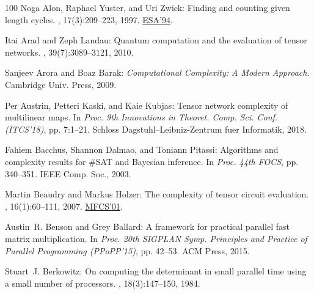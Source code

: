 \begin{thebibliography}{100}
{\sc Noga Alon, Raphael Yuster, and Uri Zwick}: Finding and counting given
  length cycles.
, 17(3):209--223, 1997.
\newblock \prelim \href{https://doi.org/10.1007/BFb0049422}{ESA'94}.
\newblock [\epfmtdoi{10.1007/BF02523189}]

{\sc Itai Arad and Zeph Landau}: Quantum computation and the evaluation of
  tensor networks.
, 39(7):3089--3121, 2010.
\newblock [\epfmtdoi{10.1137/080739379}]

{\sc Sanjeev Arora and Boaz Barak}: {\em Computational Complexity: A Modern
  Approach}.
\newblock Cambridge Univ. Press, 2009.

{\sc Per Austrin, Petteri Kaski, and Kaie Kubjas}: Tensor network complexity of
  multilinear maps.
\newblock In {\em Proc. 9th Innovations in Theoret. Comp. Sci. Conf.
  (ITCS'18)}, pp. 7:1--21. Schloss Dagstuhl--Leibniz-Zentrum fuer Informatik,
  2018.

{\sc Fahiem Bacchus, Shannon Dalmao, and Toniann Pitassi}: Algorithms and
  complexity results for {\#}{SAT} and {B}ayesian inference.
\newblock In {\em Proc. 44th FOCS}, pp. 340--351. IEEE Comp. Soc., 2003.

{\sc Martin Beaudry and Markus Holzer}: The complexity of tensor circuit
  evaluation.
, 16(1):60--111, 2007.
\newblock \prelim \href{https://doi.org/10.1007/3-540-44683-4\_16}{MFCS'01}.
\newblock [\epfmtdoi{10.1007/s00037-007-0222-0}]

{\sc Austin~R. Benson and Grey Ballard}: A framework for practical parallel
  fast matrix multiplication.
\newblock In {\em Proc. 20th SIGPLAN Symp. Principles and Practice of Parallel
  Programming (PPoPP'15)}, pp. 42--53. ACM Press, 2015.

{\sc Stuart~J. Berkowitz}: On computing the determinant in small parallel time
  using a small number of processors.
, 18(3):147--150, 1984.
\newblock [\epfmtdoi{10.1016/0020-0190(84)90018-8}]


\end{thebibliography}
